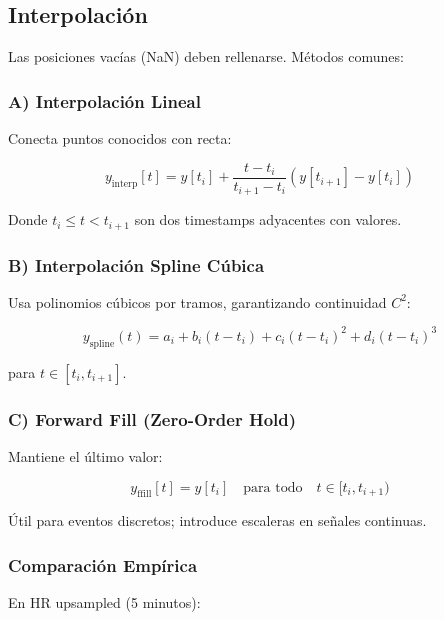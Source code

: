 \documentclass[11pt,twoside,a4paper]{article}
\begin{document}
\subsection{Interpolación}

Las posiciones vacías (NaN) deben rellenarse. Métodos comunes:

\subsubsection{A) Interpolación Lineal}

Conecta puntos conocidos con recta:

\begin{equation}
y_{\text{interp}}[t] = y[t_i] + \frac{t - t_i}{t_{i+1} - t_i} (y[t_{i+1}] - y[t_i])
\end{equation}

Donde $t_i \leq t < t_{i+1}$ son dos timestamps adyacentes con valores.

\subsubsection{B) Interpolación Spline Cúbica}

Usa polinomios cúbicos por tramos, garantizando continuidad $C^2$:

\begin{equation}
y_{\text{spline}}(t) = a_i + b_i(t - t_i) + c_i(t - t_i)^2 + d_i(t - t_i)^3
\end{equation}

para $t \in [t_i, t_{i+1}]$.

\subsubsection{C) Forward Fill (Zero-Order Hold)}

Mantiene el último valor:

\begin{equation}
y_{\text{ffill}}[t] = y[t_i] \quad \text{para todo} \quad t \in [t_i, t_{i+1})
\end{equation}

Útil para eventos discretos; introduce escaleras en señales continuas.

\subsubsection{Comparación Empírica}

En HR upsampled (5 minutos):
\end{document}
